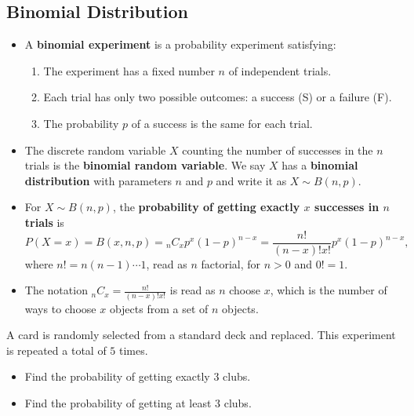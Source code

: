\hypertarget{binomial-distribution}{%
\subsection{Binomial Distribution}\label{binomial-distribution}}

\begin{itemize}
\item
  A \textbf{binomial experiment} is a probability experiment satisfying:

  \begin{enumerate}
  \item
    The experiment has a fixed number \(n\) of independent trials.
  \item
    Each trial has only two possible outcomes: a success (S) or a
    failure (F).
  \item
    The probability \(p\) of a success is the same for each trial.
  \end{enumerate}
\item
  The discrete random variable \(X\) counting the number of successes in
  the \(n\) trials is the \textbf{binomial random variable}. We say
  \(X\) has a \textbf{binomial distribution} with parameters \(n\) and
  \(p\) and write it as \(X\sim B(n, p)\).
\item
  For \(X\sim B(n, p)\), the \textbf{probability of getting exactly
  \(x\) successes in \(n\) trials} is
  \[P(X=x)=B(x,n,p)={_n C_x} p^x(1-p)^{n-x}=\frac{n!}{(n-x)!x!}p^x(1-p)^{n-x},\]
  where \(n!=n(n-1)\cdots 1\), read as \(n\) factorial, for \(n>0\) and
  \(0!=1.\)
\item
  The notation \({_n C_x}=\frac{n!}{(n-x)!x!}\) is read as \(n\) choose
  \(x\), which is the number of ways to choose \(x\) objects from a set
  of \(n\) objects.
\end{itemize}

\begin{example}

A card is randomly selected from a standard deck and replaced. This
experiment is repeated a total of \(5\) times.

\begin{itemize}
\item
  Find the probability of getting exactly \(3\) clubs.
\item
  Find the probability of getting at least \(3\) clubs.
\end{itemize}

\end{example}


